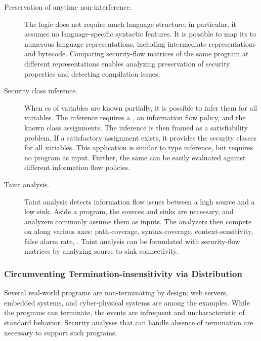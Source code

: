 \begin{description}
\item[Preservation of anytime non-interference.]
The \lname logic does not require much language structure; in particular, it
assumes no language-specific syntactic features. It is possible to map its
 to numerous language representations, including intermediate
representations and bytecode.
Comparing security-flow matrices of the same program
at different representations enables analyzing preservation of security
properties and detecting compilation issues.

\item[Security class inference.]
When es of variables are known partially, it is possible to
infer them for all variables. The inference requires a , an information flow policy, and the
known class assignments. The inference is then framed as a satisfiability
problem. If a satisfactory assignment exists, it provides the security classes
for all variables. This application is similar to type inference, but requires
no program as input. Further, the same  can be easily
evaluated against different information flow policies.

\item[Taint analysis.]
Taint analysis detects information flow issues between a high source and a low
sink. Aside a program, the sources and sinks are necessary, and analyzers
commonly assume them as inputs. The analyzers then compete on  along
various axes: path-coverage, syntax-coverage, context-sensitivity, false alarm
rate, \etc. Taint analysis can be formulated with security-flow
matrices by analyzing source to sink connectivity.
\end{description}

\subsubsection{Circumventing Termination-insensitivity via Distribution}
\label{subsub:termination}

Several real-world programs are non-terminating by design: web servers, embedded
systems, and cyber-physical systems are among the examples. While the programs
can terminate, the  events are infrequent and uncharacteristic
of standard behavior. Security analyses that can handle absence of termination
are necessary to support such programs.

